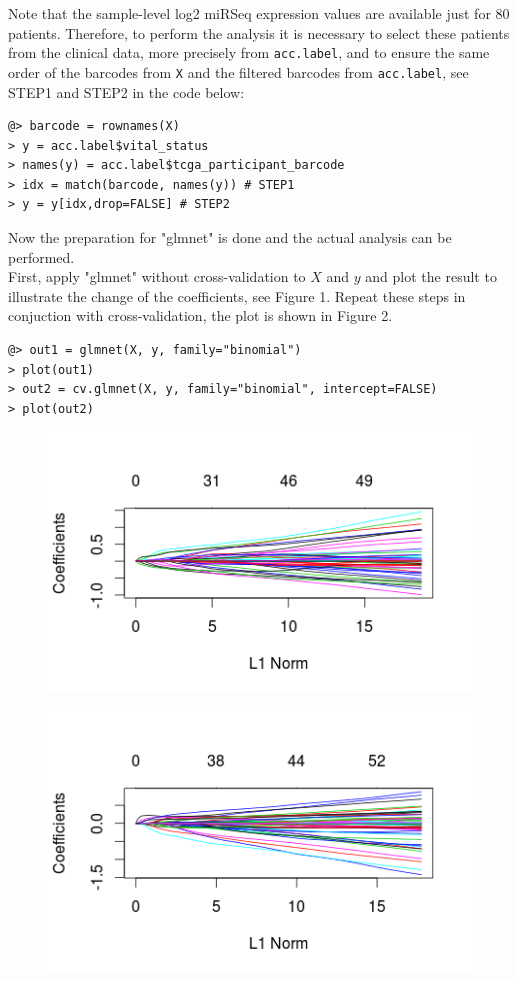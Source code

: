 \documentclass{TechReport}
\begin{document}
Note that the sample-level log2 miRSeq expression values are available just for 80 patients.
Therefore, to perform the analysis it is necessary to select these patients from the clinical data, 
more precisely from {\tt acc.label}, and to ensure the same order of the barcodes from {\tt X}
and the filtered barcodes from {\tt acc.label}, see STEP1 and STEP2 in the code below:
\begin{lstlisting}[style=base]
@> barcode = rownames(X) 
> y = acc.label$vital_status
> names(y) = acc.label$tcga_participant_barcode
> idx = match(barcode, names(y)) # STEP1
> y = y[idx,drop=FALSE] # STEP2
\end{lstlisting}
Now the preparation for "glmnet" is done and the actual analysis can be performed.\\
First, apply "glmnet" without cross-validation to $X$ and $y$ and plot the result 
to illustrate the change of the coefficients, see Figure 1. Repeat these steps in conjuction with
cross-validation, the plot is shown in Figure 2.
\begin{lstlisting}[style=base]
@> out1 = glmnet(X, y, family="binomial")
> plot(out1)
> out2 = cv.glmnet(X, y, family="binomial", intercept=FALSE)
> plot(out2)
\end{lstlisting}
\begin{figure}[h]
\centering
\includegraphics[]{Rplot1.png}
\end{figure}
\begin{figure}[h]
\centering
\includegraphics[]{Rplot2.png}
\end{figure}
\end{document}
